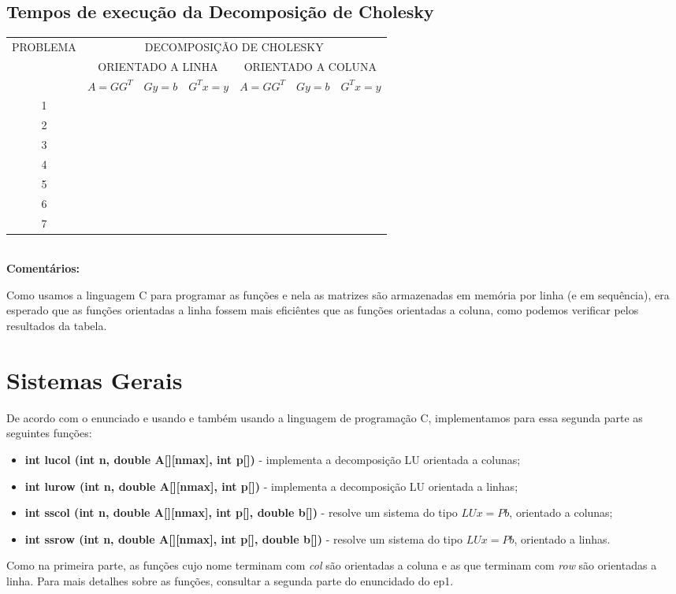 \documentclass[a4paper,11pt]{article}
\begin{document}
\subsection{Tempos de execução da Decomposição de Cholesky}

\begin{table}[htb]
	\label{tab:inters}
	\large
	\centering
	\begin{tabular}{|c|c|c|c||c|c|c|}
		\hline
		\multirow{3}{*}{PROBLEMA} & \multicolumn{6}{|c|}{DECOMPOSIÇÃO DE CHOLESKY} \\
		\cline{2-7}
		& \multicolumn{3}{|c||}{ORIENTADO A LINHA} & \multicolumn{3}{|c|}{ORIENTADO A COLUNA} \\
		\cline{2-7}
		& $A=GG^{T}$ & $Gy=b$ & $G^{T}x=y$ & $A=GG^{T}$ & $Gy=b$ & $G^{T}x=y$ \\
		\hline
		\hline
		1 &  &  &  &  &  & \\
		2 &  &  &  &  &  & \\
		3 &  &  &  &  &  & \\
		4 &  &  &  &  &  & \\
		5 &  &  &  &  &  & \\
		6 &  &  &  &  &  & \\
		7 &  &  &  &  &  & \\
		\hline
	\end{tabular}
\end{table}
\  \\
{\bf Comentários:} 

Como usamos a linguagem C para programar as funções e nela as matrizes são armazenadas em memória por linha (e em sequência), era esperado que as funções orientadas a linha fossem mais eficiêntes que as funções orientadas a coluna, como podemos verificar pelos resultados da tabela. 

\section{Sistemas Gerais}

De acordo com o enunciado e usando e também usando a linguagem de programação C, implementamos para essa segunda parte as seguintes funções: 
\begin{itemize}
	\item {\bf int lucol (int n, double A[][nmax], int p[])} - implementa a decomposição LU orientada a colunas;
	\item {\bf int lurow (int n, double A[][nmax], int p[])} - implementa a decomposição LU orientada a linhas;	
	\item {\bf int sscol (int n, double A[][nmax], int p[], double b[])} - resolve um sistema do tipo $LUx=Pb$, orientado a colunas;
	\item {\bf int ssrow (int n, double A[][nmax], int p[], double b[])} - resolve um sistema do tipo $LUx=Pb$, orientado a linhas.
\end{itemize}
Como na primeira parte, as funções cujo nome terminam com {\it col} são orientadas a coluna e as que terminam com {\it row} são orientadas a linha. Para mais detalhes sobre as funções, consultar a segunda parte do enuncidado do ep1.
\end{document}
